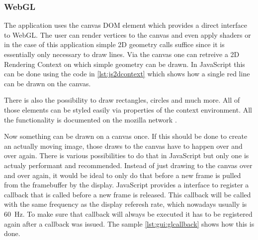 %
%

\subsubsection{WebGL}
\label{subsec:gui:webgl}

The application uses the canvas DOM element which provides a direct interface to WebGL. The user can render vertices to the canvas and even apply shaders or in the case of this application simple 2D geometry calls suffice since it is essentially only necessary to draw lines.
Via the canvas one can retreive a 2D Rendering Context on which simple geometry can be drawn.
In JavaScript this can be done using the code in \ref{lst:js2dcontext} which shows how a single red line can be drawn on the canvas.


There is also the possibility to draw rectangles, circles and much more. All of those elements can be styled easily via properties of the context environment. All the functionality is documented on the mozilla network \cite{moz:2dcontext}.

Now something can be drawn on a canvas once. If this should be done to create an actually moving image, those draws to the canvas have to happen over and over again. There is various possibilities to do that in JavaScript but only one is actualy performant and recommended. Instead of just drawing to the canvas over and over again, it would be ideal to only do that before a new frame is pulled from the framebuffer by the display. JavaScript provides a interface to register a callback that is called before a new frame is released. This callback will be called with the same frequency as the display referesh rate, which nowadays usually is \SI{60}{\hertz}.
To make sure that callback will always be executed it has to be registered again after a callback was issued. The sample \ref{lst:gui:glcallback} shows how this is done.

